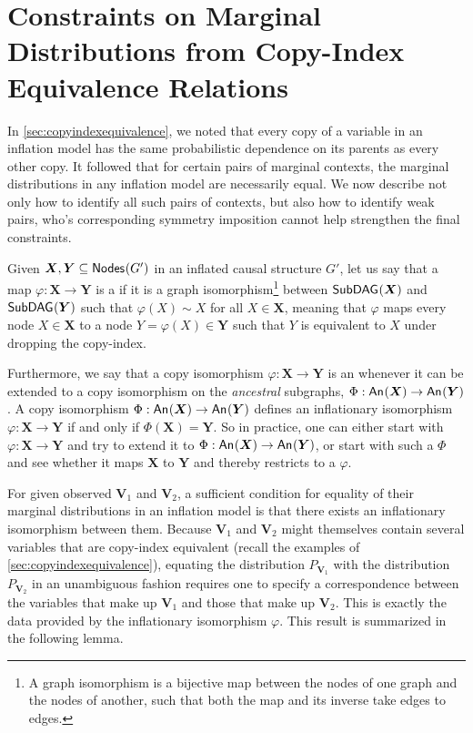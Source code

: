 \documentclass[aps,english,10pt,superscriptaddress,onecolumn,twoside,longbibliography,pra,floatfix,fleqn,nofootinbib]{revtex4-1}
\newcommand*{\tblue}[1]{{\color{medblue}{\textbf{#1}}}}
\theoremstyle{definition}
\newcounter{example}[section]
\newcommand{\An}[2][]{{\mathsf{An}_{#1}}\parenths{#2}}
\newcommand{\SmallNamedFunction}[3][]{\operatorname{\mathsf{#2}}_{#1}\parenths{#3}}
\newcommand{\subgraph}[2][]{\SmallNamedFunction[#1]{SubDAG}{#2}}
\newcommand{\nodes}[1]{\SmallNamedFunction{Nodes}{#1}}
\DeclarePairedDelimiter{\parenths}{\lparen}{\rparen}
\begin{document}
\section{Constraints on Marginal Distributions from Copy-Index Equivalence Relations}\label{sec:coincidingdetails}

In \cref{sec:copyindexequivalence}, we noted that every copy of a variable in an inflation model has the same probabilistic dependence on its parents as every other copy. It followed that for certain pairs of marginal contexts, the marginal distributions in any inflation model are necessarily equal. We now describe not only how to identify all such pairs of contexts, but also how to identify weak pairs, who's corresponding symmetry imposition cannot help strengthen the final constraints.

Given $\bm{X},\bm{Y}\subseteq\nodes{G'}$ in an inflated causal structure $G'$, let us say that a map $\varphi:\bm{X}\to\bm{Y}$ is a \tblue{copy isomorphism} if it is a graph isomorphism\footnote{A graph isomorphism is a bijective map between the nodes of one graph and the nodes of another, such that both the map and its inverse take edges to edges.} between $\subgraph{\bm{X}}$ and $\subgraph{\bm{Y}}$ such that $\varphi(X)\sim X$ for all $X\in\bm{X}$, meaning that $\varphi$ maps every node $X\in\bm{X}$ to a node $Y{=}\varphi(X)\in\bm{Y}$ such that $Y$ is equivalent to $X$ under dropping the copy-index.

Furthermore, we say that a copy isomorphism $\varphi : \bm{X}\to\bm{Y}$ is an \tblue{inflationary isomorphism} whenever it can be extended to a copy isomorphism on the \emph{ancestral} subgraphs, $\Phi : \An{\bm{X}}\to\An{\bm{Y}}$. 
A copy isomorphism $\Phi: \An{\bm{X}}\to\An{\bm{Y}}$ defines an inflationary isomorphism $\varphi:\bm{X}\to\bm{Y}$ if and only if $\Phi(\bm{X}) = \bm{Y}$.
So in practice, one can either start with $\varphi : \bm{X}\to\bm{Y}$ and try to extend it to $\Phi : \An{\bm{X}}\to\An{\bm{Y}}$, or start with such a $\Phi$ and see whether it maps $\bm{X}$ to $\bm{Y}$ and thereby restricts to a $\varphi$.

For given observed $\bm{V}_1$ and $\bm{V}_2$, a sufficient condition for equality of their marginal distributions in an inflation model is that there exists an inflationary isomorphism between them.  Because $\bm{V}_1$ and $\bm{V}_2$ might themselves contain several variables that are copy-index equivalent (recall the examples of \cref{sec:copyindexequivalence}), equating the distribution $P_{\bm{V}_1}$ with the distribution $P_{\bm{V}_2}$ in an unambiguous fashion requires one to specify a correspondence between the variables that make up $\bm{V}_1$ and those that make up $\bm{V}_2$. This is exactly the data provided by the inflationary isomorphism $\varphi$.  This result is summarized in the following lemma.
\end{document}
